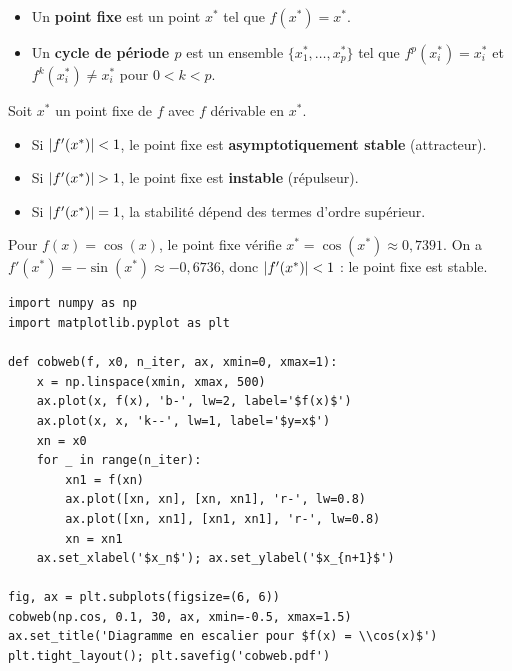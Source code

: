 \begin{definition}
\begin{itemize}
  \item Un \textbf{point fixe} est un point $x^*$ tel que $f(x^*)=x^*$.
  \item Un \textbf{cycle de p\'eriode $p$} est un ensemble
    $\{x_1^*,\ldots,x_p^*\}$ tel que $f^p(x_i^*)=x_i^*$ et
    $f^k(x_i^*)\neq x_i^*$ pour $0<k<p$.
\end{itemize}
\end{definition}

\begin{theoreme}
Soit $x^*$ un point fixe de $f$ avec $f$ d\'erivable en $x^*$.
\begin{itemize}
  \item Si $\left| f'(x^*) \right| < 1$, le point fixe est
    \textbf{asymptotiquement stable} (attracteur).
  \item Si $\left| f'(x^*) \right| > 1$, le point fixe est \textbf{instable}
    (r\'epulseur).
  \item Si $\left| f'(x^*) \right| = 1$, la stabilit\'e d\'epend des termes
    d'ordre sup\'erieur.
\end{itemize}
\end{theoreme}

\begin{exemple}
Pour $f(x) = \cos(x)$, le point fixe v\'erifie $x^*=\cos(x^*)
\approx 0{,}7391$.  On a $f'(x^*)=-\sin(x^*)\approx -0{,}6736$,
donc $\left| f'(x^*) \right|<1$ : le point fixe est stable.
\end{exemple}

\begin{codeblock}[title=\textbf{Diagramme en escalier (toile d'araign\'ee)}]
\begin{verbatim}
import numpy as np
import matplotlib.pyplot as plt

def cobweb(f, x0, n_iter, ax, xmin=0, xmax=1):
    x = np.linspace(xmin, xmax, 500)
    ax.plot(x, f(x), 'b-', lw=2, label='$f(x)$')
    ax.plot(x, x, 'k--', lw=1, label='$y=x$')
    xn = x0
    for _ in range(n_iter):
        xn1 = f(xn)
        ax.plot([xn, xn], [xn, xn1], 'r-', lw=0.8)
        ax.plot([xn, xn1], [xn1, xn1], 'r-', lw=0.8)
        xn = xn1
    ax.set_xlabel('$x_n$'); ax.set_ylabel('$x_{n+1}$')

fig, ax = plt.subplots(figsize=(6, 6))
cobweb(np.cos, 0.1, 30, ax, xmin=-0.5, xmax=1.5)
ax.set_title('Diagramme en escalier pour $f(x) = \\cos(x)$')
plt.tight_layout(); plt.savefig('cobweb.pdf')
\end{verbatim}
\end{codeblock}

